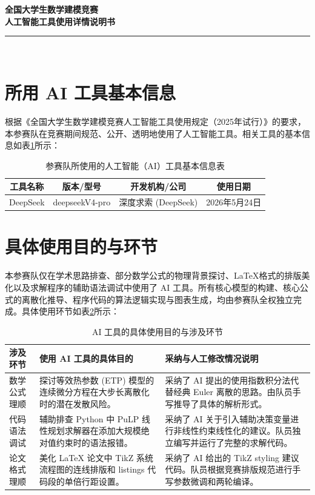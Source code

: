 \documentclass[12pt,a4paper]{article}
\begin{document}
\begin{center}
    \vspace*{0.5cm}
    {\bfseries\heiti 全国大学生数学建模竞赛}\\
    {\bfseries\heiti 人工智能工具使用详情说明书}\\[0.6cm]
    \rule{\textwidth}{1.5pt}\\[0.8cm]
\end{center}

\section{所用 AI 工具基本信息}
根据《全国大学生数学建模竞赛人工智能工具使用规定（2025年试行）》的要求，本参赛队在竞赛期间规范、公开、透明地使用了人工智能工具。相关工具的基本信息如表\ref{tab:ai_info}所示：

\begin{table}[H]
    \centering
    \caption{参赛队所使用的人工智能（AI）工具基本信息表}
    \label{tab:ai_info}
    \begin{tabular}{cccc}
        \toprule
        \textbf{工具名称} & \textbf{版本/型号} & \textbf{开发机构/公司} & \textbf{使用日期} \\ \midrule
        DeepSeek & deepseekV4-pro & 深度求索 (DeepSeek) & 2026年5月24日 \\
        \bottomrule
    \end{tabular}
\end{table}

\section{具体使用目的与环节}
本参赛队仅在学术思路排查、部分数学公式的物理背景探讨、LaTeX格式的排版美化以及求解程序的辅助语法调试中使用了 AI 工具。所有核心模型的构建、核心公式的离散化推导、程序代码的算法逻辑实现与图表生成，均由参赛队全权独立完成。具体使用环节如表\ref{tab:ai_usage}所示：

\begin{table}[H]
    \centering
    \caption{AI 工具的具体使用目的与涉及环节}
    \label{tab:ai_usage}
    \begin{tabular}{lp{6.5cm}p{6cm}}
        \toprule
        \textbf{涉及环节} & \textbf{使用 AI 工具的具体目的} & \textbf{采纳与人工修改情况说明} \\ \midrule
        数学公式理顺 & 探讨等效热参数 (ETP) 模型的连续微分方程在大步长离散化时的潜在发散风险。 & 采纳了 AI 提出的使用指数积分法代替经典 Euler 离散的思路。由队员手写推导了具体的解析形式。 \\ \addlinespace
        代码语法调试 & 辅助排查 Python 中 PuLP 线性规划求解器在添加大规模绝对值约束时的语法报错。 & 采纳了 AI 关于引入辅助决策变量进行非线性约束线性化的建议。队员独立编写并运行了完整的求解代码。 \\ \addlinespace
        论文格式理顺 & 美化 LaTeX 论文中 TikZ 系统流程图的连线排版和 listings 代码段的单倍行距设置。 & 采纳了 AI 给出的 TikZ styling 建议代码。队员根据竞赛排版规范进行手写参数微调和两轮编译。 \\
        \bottomrule
    \end{tabular}
\end{table}
\end{document}
